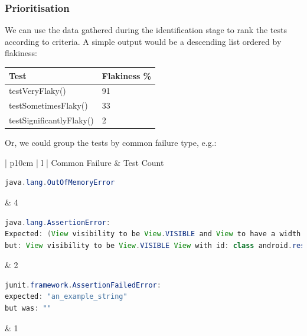 \subsubsection{Prioritisation}

We can use the data gathered during the identification stage to rank the tests according to criteria. A simple output would be a descending list ordered by flakiness:

\begin{center}
    \begin{tabular}{ | l | p{5cm} |}
    \hline
    Test & Flakiness \% \\ \hline
    testVeryFlaky() & 91 \\ \hline
    testSometimesFlaky() & 33 \\ \hline
    testSignificantlyFlaky() & 2 \\ \hline
    \end{tabular}
\end{center}

Or, we could group the tests by common failure type, e.g.:


\begin{center}
    \begin{tabular}{| p{10cm} | l |}
    \hline
    Common Failure & \flaky{} Test Count \\ \hline
    {\begin{lstlisting}[language=Java, numbers=none]
java.lang.OutOfMemoryError
	\end{lstlisting}}
    & 4 \\ \hline
    {\begin{lstlisting}[language=Java, numbers=none]
java.lang.AssertionError:
Expected: (View visibility to be View.VISIBLE and View to have a width and a height)
but: View visibility to be View.VISIBLE View with id: class android.resources.R$id.anExampleView(1) had a visibility of View.GONE
	\end{lstlisting}}
	& 2 \\ \hline
    {\begin{lstlisting}[language=Java, numbers=none]
junit.framework.AssertionFailedError:
expected: "an_example_string"
but was: ""
	\end{lstlisting}}
	& 1 \\ \hline

    \end{tabular}
\end{center}

